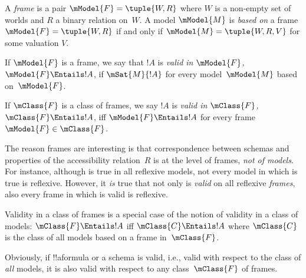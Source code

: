 \documentclass[../../../include/open-logic-section]{subfiles}
\begin{document}


\begin{defn}
  A \emph{frame} is a pair $\mModel{F} = \tuple{W,R}$ where $W$ is a
  non-empty set of worlds and $R$ a binary relation on~$W$. A model
  $\mModel{M}$ is \emph{based on} a frame $\mModel{F} = \tuple{W,R}$
  if and only if $\mModel{M} = \tuple{W, R, V}$ for some valuation $V$.
\end{defn}

\begin{defn}
  If $\mModel{F}$ is a frame, we say that $!A$ is \emph{valid in
    $\mModel{F}$,} $\mModel{F} \Entails !A$, if $\mSat{M}{!A}$ for
  every model~$\mModel{M}$ based on~$\mModel{F}$.
  
  If $\mClass{F}$ is a class of frames, we say $!A$ is \emph{valid in
    $\mClass{F}$,} $\mClass{F} \Entails !A$, iff $\mModel{F} \Entails
  !A$ for every frame~$\mModel{F} \in \mClass{F}$.
\end{defn}

The reason frames are interesting is that correspondence between
schemas and properties of the accessibility relation~$R$ is at the
level of frames, \emph{not of models}. For instance, although 
is true in all reflexive models, not every model in which  is
true is reflexive. However, it \emph{is} true that not only is 
\emph{valid} on all reflexive \emph{frames}, also every frame in
which  is valid is reflexive.

\begin{rem}
Validity in a class of frames is a special case of the notion of
validity in a class of models: $\mClass{F} \Entails !A$ iff
$\mClass{C} \Entails !A$ where $\mClass{C}$ is the class of all models
based on a frame in~$\mClass{F}$.

Obviously, if !!a{formula} or a schema is valid, i.e., valid with
respect to the class of \emph{all} models, it is also valid with
respect to any class~$\mClass{F}$ of frames.
\end{rem}
\end{document}
